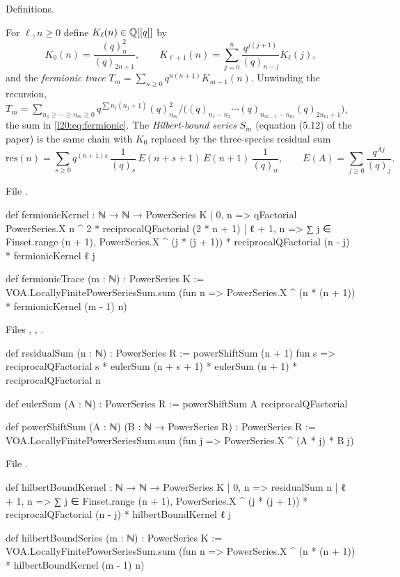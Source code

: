 \begin{status}
Definitions.
\end{status}

\begin{definition}\label{l20:def:chain}
For $\ell,n\ge0$ define $K_\ell(n)\in{\mathbb{Q}}[[q]]$ by
\begin{equation*}
K_0(n)=\frac{(q)_n^2}{(q)_{2n+1}},\qquad K_{\ell+1}(n)=\sum_{j=0}^n\frac{q^{j(j+1)}}{(q)_{n-j}}K_\ell(j),
\end{equation*}
and the \emph{fermionic trace} $T_m=\sum_{n\ge0}q^{n(n+1)}K_{m-1}(n)$. Unwinding the recursion,
$T_m=\sum_{n_1\ge\cdots\ge n_m\ge0}q^{\sum n_j(n_j+1)}(q)_{n_m}^2/\bigl((q)_{n_1-n_2}\cdots
(q)_{n_{m-1}-n_m}(q)_{2n_m+1}\bigr)$, the sum in \eqref{l20:eq:fermionic}. The \emph{Hilbert-bound series}
$S_m$ (equation (5.12) of the paper) is the same chain with $K_0$ replaced by the three-species residual sum
\begin{equation*}
\mathrm{res}(n)=\sum_{s\ge0}q^{(n+1)s}\,\frac{1}{(q)_s}\,E(n+s+1)\,E(n+1)\,\frac{1}{(q)_n},\qquad
E(A)=\sum_{j\ge0}\frac{q^{Aj}}{(q)_j}.
\end{equation*}
\end{definition}
\noindent File .
\begin{leancode}
def fermionicKernel : ℕ → ℕ → PowerSeries K
  | 0, n => qFactorial PowerSeries.X n ^ 2 * reciprocalQFactorial (2 * n + 1)
  | ℓ + 1, n => ∑ j ∈ Finset.range (n + 1),
      PowerSeries.X ^ (j * (j + 1)) * reciprocalQFactorial (n - j) * fermionicKernel ℓ j

def fermionicTrace (m : ℕ) : PowerSeries K :=
  VOA.LocallyFinitePowerSeriesSum.sum (fun n =>
    PowerSeries.X ^ (n * (n + 1)) * fermionicKernel (m - 1) n)
\end{leancode}
\noindent Files ,
,
.
\begin{leancode}
def residualSum (n : ℕ) : PowerSeries R :=
  powerShiftSum (n + 1) fun s =>
    reciprocalQFactorial s * eulerSum (n + s + 1) *
      eulerSum (n + 1) * reciprocalQFactorial n

def eulerSum (A : ℕ) : PowerSeries R :=
  powerShiftSum A reciprocalQFactorial

def powerShiftSum (A : ℕ) (B : ℕ → PowerSeries R) : PowerSeries R :=
  VOA.LocallyFinitePowerSeriesSum.sum (fun j => PowerSeries.X ^ (A * j) * B j)
\end{leancode}
\noindent File .
\begin{leancode}
def hilbertBoundKernel : ℕ → ℕ → PowerSeries K
  | 0, n => residualSum n
  | ℓ + 1, n => ∑ j ∈ Finset.range (n + 1),
      PowerSeries.X ^ (j * (j + 1)) * reciprocalQFactorial (n - j) * hilbertBoundKernel ℓ j

def hilbertBoundSeries (m : ℕ) : PowerSeries K :=
  VOA.LocallyFinitePowerSeriesSum.sum (fun n =>
    PowerSeries.X ^ (n * (n + 1)) * hilbertBoundKernel (m - 1) n)
\end{leancode}

